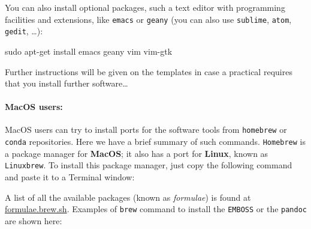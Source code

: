\documentclass[10pt,a4paper,]{article}
\newenvironment{Shaded}{}{}
\newcommand{\CommentTok}[1]{\textcolor[rgb]{0.38,0.63,0.69}{\textit{#1}}}
\newcommand{\ExtensionTok}[1]{#1}
\newcommand{\FunctionTok}[1]{\textcolor[rgb]{0.02,0.16,0.49}{#1}}
\newcommand{\NormalTok}[1]{#1}
\newcommand{\StringTok}[1]{\textcolor[rgb]{0.25,0.44,0.63}{#1}}
\newcommand{\VariableTok}[1]{\textcolor[rgb]{0.10,0.09,0.49}{#1}}
\begin{document}
You can also install optional packages, such a text editor with
programming facilities and extensions, like \texttt{emacs} or
\texttt{geany} (you can also use \texttt{sublime}, \texttt{atom},
\texttt{gedit}, \ldots{}):

\begin{Shaded}
\begin{Highlighting}[]
\FunctionTok{sudo}\NormalTok{ apt-get install emacs geany vim vim-gtk}
\end{Highlighting}
\end{Shaded}

Further instructions will be given on the templates in case a practical
requires that you install further software\ldots{}

\hypertarget{macos-users}{%
\paragraph{\texorpdfstring{\textbf{MacOS}
users:}{MacOS users:}}\label{macos-users}}

MacOS users can try to install ports for the software tools from
\texttt{homebrew} or \texttt{conda} repositories. Here we have a brief
summary of such commands. \texttt{Homebrew} is a package manager for
\textbf{MacOS}; it also has a port for \textbf{Linux}, known as
\texttt{Linuxbrew}. To install this package manager, just copy the
following command and paste it to a Terminal window:

\begin{Shaded}
\end{Shaded}

A list of all the available packages (known as \emph{formulae}) is found
at \href{https://formulae.brew.sh}{formulae.brew.sh}. Examples of
\texttt{brew} command to install the \texttt{EMBOSS} or the
\texttt{pandoc} are shown here:
\end{document}
